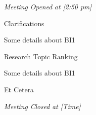 \documentclass[10pt,a4paper,twoside]{mins}
\begin{document}
\begin{minutes}
\begin{center}\emph{Meeting Opened at [2:50 pm]}\end{center}
\begin{business}
\item Clarifications

Some details about BI1

\item Research Topic Ranking

Some details about BI1

\item Et Cetera

\end{business}
\begin{center}\emph{Meeting Closed at [Time]}\end{center}
\end{minutes}
\end{document}
